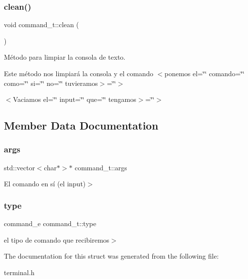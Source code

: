 \subsubsection{\texorpdfstring{clean()}{clean()}}
{\footnotesize\ttfamily void command\+\_\+t\+::clean (\begin{DoxyParamCaption}{ }\end{DoxyParamCaption})\hspace{0.3cm}{\ttfamily [inline]}}



Método para limpiar la consola de texto. 

Este método nos limpiará la consola y el comando $<$ponemos el=\char`\"{}\char`\"{} comando=\char`\"{}\char`\"{} como=\char`\"{}\char`\"{} si=\char`\"{}\char`\"{} no=\char`\"{}\char`\"{} tuvieramos$>$=\char`\"{}\char`\"{}$>$

$<$\+Vaciamos el=\char`\"{}\char`\"{} input=\char`\"{}\char`\"{} que=\char`\"{}\char`\"{} tengamos$>$=\char`\"{}\char`\"{}$>$ 

\subsection{Member Data Documentation}
\mbox{\label{structcommand__t_a1de9d090c1926cf39720267947f11699}} 
\subsubsection{\texorpdfstring{args}{args}}
{\footnotesize\ttfamily std\+::vector$<$char$\ast$$>$$\ast$ command\+\_\+t\+::args}

El comando en sí (el input)$>$ \mbox{\label{structcommand__t_a82809ade46f827d02e768160a72ab926}} 
\subsubsection{\texorpdfstring{type}{type}}
{\footnotesize\ttfamily command\+\_\+e command\+\_\+t\+::type}

el tipo de comando que recibiremos$>$ 

The documentation for this struct was generated from the following file\+:\begin{DoxyCompactItemize}
\item 
terminal.\+h\end{DoxyCompactItemize}
